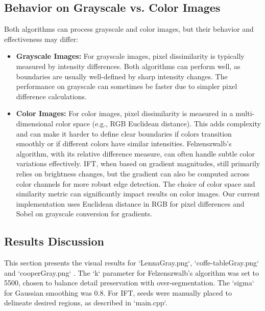 \documentclass{sbc2023}
\begin{document}
\subsection{Behavior on Grayscale vs. Color Images}
Both algorithms can process grayscale and color images, but their behavior and effectiveness may differ:

\begin{itemize}
    \item \textbf{Grayscale Images:} For grayscale images, pixel dissimilarity is typically measured by intensity differences. Both algorithms can perform well, as boundaries are usually well-defined by sharp intensity changes. The performance on grayscale can sometimes be faster due to simpler pixel difference calculations.
    \item \textbf{Color Images:} For color images, pixel dissimilarity is measured in a multi-dimensional color space (e.g., RGB Euclidean distance). This adds complexity and can make it harder to define clear boundaries if colors transition smoothly or if different colors have similar intensities. Felzenszwalb's algorithm, with its relative difference measure, can often handle subtle color variations effectively. IFT, when based on gradient magnitudes, still primarily relies on brightness changes, but the gradient can also be computed across color channels for more robust edge detection. The choice of color space and similarity metric can significantly impact results on color images. Our current implementation uses Euclidean distance in RGB for pixel differences and Sobel on grayscale conversion for gradients.
\end{itemize}

\subsection{Results Discussion}

This section presents the visual results for `LennaGray.png`, `coffe-tableGray.png` and `cooperGray.png` . The `k` parameter for Felzenszwalb's algorithm was set to 5500, chosen to balance detail preservation with over-segmentation. The `sigma` for Gaussian smoothing was 0.8. For IFT, seeds were manually placed to delineate desired regions, as described in `main.cpp`.
\end{document}
